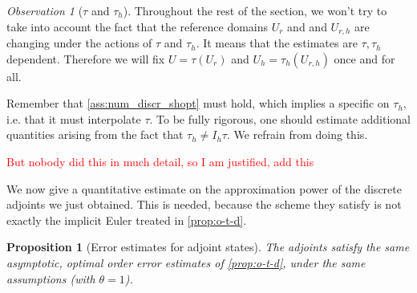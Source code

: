 \documentclass[english,a4paper,10pt,oneside]{scrbook}	%
\theoremstyle{break}
\newtheorem{prop}[equation]{Proposition}
\theoremstyle{remark}
\newtheorem{obs}[equation]{Observation}
\begin{document}
\begin{obs}[$\tau$ and $\tau_h$]
\label{obs:tau_vs_tau_h}
Throughout the rest of the section, we won't try to take into account the fact that the reference domains $U_r$ and and $U_{r,h}$ are changing under the actions of $\tau$ and $\tau_h$. It means that the estimates are $\tau, \tau_h$ dependent. Therefore we will fix $U = \tau(U_r)$ and $U_h=\tau_h(U_{r,h})$ once and for all. 


Remember that \cref{ass:num_discr_shopt} must hold, which implies a specific on $\tau_h$, i.e. that it must interpolate $\tau$. To be fully rigorous, one should estimate additional quantities arising from the fact that $\tau_h \neq I_h\tau$. We refrain from doing this.

\textcolor{red}{But nobody did this in much detail, so I am justified, add this}
\end{obs}

We now give a quantitative estimate on the approximation power of the discrete adjoints we just obtained. This is needed, because the scheme they satisfy is not exactly the implicit Euler treated in \cref{prop:o-t-d}.

\begin{prop}[Error estimates for adjoint states]
\label{prop:d-t-o_estimates}
The adjoints satisfy the same asymptotic, optimal order error estimates of \cref{prop:o-t-d}, under the same assumptions (with $\theta = 1$).
\end{prop}
\end{document}
